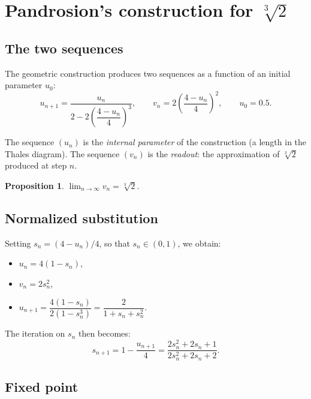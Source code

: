 \documentclass[11pt,a4paper]{article}
\theoremstyle{definition}
\newtheorem{proposition}{Proposition}[section]
\newcommand{\cbrt}[1]{\sqrt[3]{#1}}
\begin{document}
\section{Pandrosion's construction for \texorpdfstring{$\cbrt{2}$}{cbrt(2)}}
\label{sec:pandrosion3}

\subsection{The two sequences}

The geometric construction produces two sequences as a function of an initial parameter $u_0$:
\begin{equation}
  \label{eq:pandrosion_orig}
  u_{n+1} = \frac{u_n}{2 - 2\!\left(\dfrac{4 - u_n}{4}\right)^{\!3}},
  \qquad
  v_n = 2\!\left(\frac{4 - u_n}{4}\right)^{\!2},
  \qquad u_0 = 0.5.
\end{equation}

The sequence $(u_n)$ is the \emph{internal parameter} of the construction (a length in the Thales diagram). The sequence $(v_n)$ is the \emph{readout}: the approximation of $\cbrt{2}$ produced at step $n$.

\begin{proposition}
$\displaystyle\lim_{n\to\infty} v_n = \cbrt{2}$.
\end{proposition}

\subsection{Normalized substitution}

Setting $s_n = (4 - u_n)/4$, so that $s_n \in (0,1)$, we obtain:
\begin{itemize}
  \item $u_n = 4(1 - s_n)$,
  \item $v_n = 2s_n^2$,
  \item $u_{n+1} = \dfrac{4(1-s_n)}{2(1-s_n^3)} = \dfrac{2}{1 + s_n + s_n^2}$.
\end{itemize}

The iteration on $s_n$ then becomes:
\begin{equation}
  \label{eq:iter_s3}
  s_{n+1} = 1 - \frac{u_{n+1}}{4} = \frac{2s_n^2 + 2s_n + 1}{2s_n^2 + 2s_n + 2}.
\end{equation}

\subsection{Fixed point}
\end{document}
